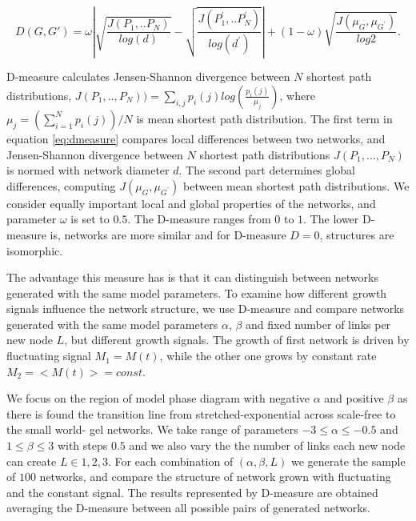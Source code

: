 \begin{equation} 
\label{eq:dmeasure}
D(G,G') = \omega \left| \sqrt{\frac{J(P_1,..P_N)}{log(d)}}-\sqrt{\frac{J(P_1^{'},..P_N^{'})}{log(d^{'})}} \right| \nonumber +  (1-\omega) \sqrt{\frac{J(\mu_{G},\mu_{G^{'}})}{log2}}.
\end{equation}

D-measure calculates Jensen-Shannon divergence between $N$ shortest path distributions, $J(P_1,.., P_N)) = \sum_{i,j}p_i(j)log(\frac{p_i(j)}{\mu_j})$, where  $\mu_j = (\sum_{i=1}^N p_i(j))/N$ is mean shortest path distribution. The first term in equation \ref{eq:dmeasure} compares local differences between two networks, and Jensen-Shannon divergence between $N$ shortest path distributions $J(P_{1},...,P_{N})$ is normed with network diameter $d$. The second part determines global differences, computing  ${J(\mu_{G},\mu_{G^{'}})}$ between mean shortest path distributions. We consider equally important local and global properties of the networks, and parameter $\omega$ is set to $0.5$. The D-measure ranges from $0$ to $1$. The lower D-measure is, networks are more similar and for D-measure $D = 0$, structures are isomorphic.

The advantage this measure has is that it can distinguish between networks generated with the same model parameters. To examine how different growth signals influence the network structure, we use D-measure and compare networks generated with the same model parameters $\alpha$, $\beta$ and fixed number of links per new node $L$, but different growth signals. The growth of first network is driven by fluctuating signal $M_1 = {M(t)}$, while the other one grows by constant rate $M_2=<M(t)> = const$. 

We focus on the region of model phase diagram with negative $\alpha$ and positive $\beta$ as there is found the transition line from stretched-exponential across scale-free to the small world- gel networks. We take range of parameters  $-3\leq\alpha\leq-0.5$ and $1\leq\beta\leq3$ with steps $0.5$ and we also vary the the number of links each new node can create $L\in{1, 2, 3}$. For each combination of $(\alpha, \beta, L)$ we generate the sample of $100$ networks, and compare the structure of network grown with fluctuating and the constant signal. The results represented by D-measure are obtained averaging the D-measure between all possible pairs of generated networks.     

